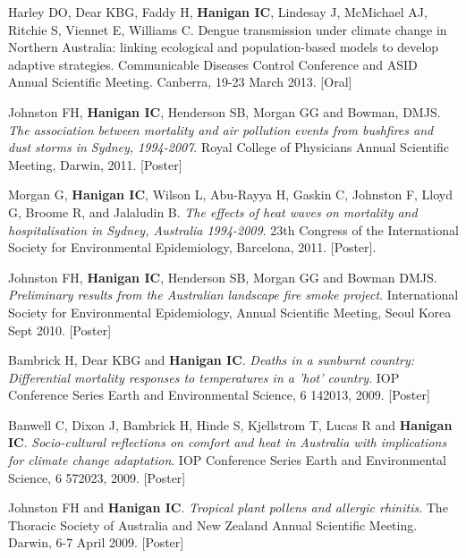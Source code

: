 \documentclass[a4paper,11pt]{article}
\begin{document}
\begin{revnumerate}
\item Harley DO, Dear KBG, Faddy H, \textbf{Hanigan IC}, Lindesay J, McMichael AJ, Ritchie S, Viennet E, Williams C. Dengue transmission under climate change in Northern Australia: linking ecological and population-based models to develop adaptive strategies. Communicable Diseases Control Conference and ASID Annual Scientific Meeting. Canberra, 19-23 March 2013.  [Oral]

\item Johnston FH, \textbf{Hanigan IC}, Henderson SB, Morgan GG and Bowman, DMJS. \emph{The association between mortality and air pollution events from bushfires and dust storms in Sydney, 1994-2007}. Royal College of Physicians Annual Scientific Meeting, Darwin,  2011. [Poster]

\item Morgan G, \textbf{Hanigan IC}, Wilson L, Abu-Rayya H, Gaskin C, Johnston F, Lloyd G, Broome R, and Jalaludin B. \emph{The effects of heat waves on mortality and hospitalisation in Sydney, Australia 1994-2009}. 23th Congress of the International Society for Environmental Epidemiology, Barcelona, 2011. [Poster].

\item Johnston FH, \textbf{Hanigan IC}, Henderson SB, Morgan GG and Bowman DMJS. \emph{Preliminary results from the Australian landscape fire smoke project}. International Society for Environmental Epidemiology, Annual Scientific Meeting, Seoul Korea Sept 2010. [Poster]

\item Bambrick H, Dear KBG and \textbf{Hanigan IC}.  \emph{Deaths in a sunburnt country: Differential mortality responses to temperatures in a 'hot' country}. IOP Conference Series Earth and Environmental Science, 6 142013, 2009. [Poster]

\item Banwell C, Dixon J, Bambrick H, Hinde S, Kjellstrom T, Lucas R and \textbf{Hanigan IC}. \emph{Socio-cultural reflections on comfort and heat in Australia with implications for climate change adaptation}. IOP Conference Series Earth and Environmental Science, 6 572023, 2009. [Poster]

\item Johnston FH and \textbf{Hanigan IC}.  \emph{Tropical plant pollens and allergic rhinitis}.  The Thoracic Society of Australia and New Zealand Annual Scientific Meeting.  Darwin, 6-7 April 2009. [Poster]


\end{revnumerate}
\end{document}
